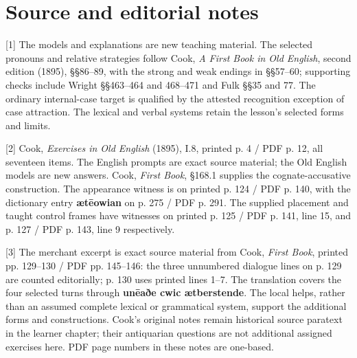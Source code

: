 \clearpage
\section*{Source and editorial notes}

\begingroup\fontsize{10}{12.8}\selectfont
[1] The models and explanations are new teaching material. The selected pronouns and relative strategies follow Cook, \emph{A First Book in Old English}, second edition (1895), §§86–89, with the strong and weak endings in §§57–60; supporting checks include Wright §§463–464 and 468–471 and Fulk §§35 and 77. The ordinary internal-case target is qualified by the attested recognition exception of case attraction. The lexical and verbal systems retain the lesson's selected forms and limits.

[2] Cook, \emph{Exercises in Old English} (1895), I.8, printed p. 4 /\allowbreak{} PDF p. 12, all seventeen items. The English prompts are exact source material; the Old English models are new answers. Cook, \emph{First Book}, §168.1 supplies the cognate-accusative construction. The appearance witness is on printed p. 124 /\allowbreak{} PDF p. 140, with the dictionary entry \textbf{ætēowian} on p. 275 /\allowbreak{} PDF p. 291. The supplied placement and taught control frames have witnesses on printed p. 125 /\allowbreak{} PDF p. 141, line 15, and p. 127 /\allowbreak{} PDF p. 143, line 9 respectively.

[3] The merchant excerpt is exact source material from Cook, \emph{First Book}, printed pp. 129–130 /\allowbreak{} PDF pp. 145–146: the three unnumbered dialogue lines on p. 129 are counted editorially; p. 130 uses printed lines 1–7. The translation covers the four selected turns through \textbf{unēaðe cwic ætberstende}. The local helps, rather than an assumed complete lexical or grammatical system, support the additional forms and constructions. Cook's original notes remain historical source paratext in the learner chapter; their antiquarian questions are not additional assigned exercises here. PDF page numbers in these notes are one-based.

\endgroup

\par\label{end-ch08-key}
\clearpage\endgroup
